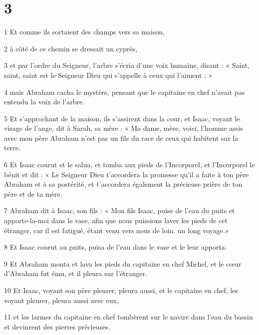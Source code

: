 \chapter{3}

\par 1 Et comme ils sortaient des champs vers sa maison,

\par 2 à côté de ce chemin se dressait un cyprès,

\par 3 et par l'ordre du Seigneur, l'arbre s'écria d'une voix humaine, disant : « Saint, saint, saint est le Seigneur Dieu qui s'appelle à ceux qui l'aiment ; »

\par 4 mais Abraham cacha le mystère, pensant que le capitaine en chef n'avait pas entendu la voix de l'arbre.

\par 5 Et s'approchant de la maison, ils s'assirent dans la cour, et Isaac, voyant le visage de l'ange, dit à Sarah, sa mère : « Ma dame, mère, voici, l'homme assis avec mon père Abraham n'est pas un fils du race de ceux qui habitent sur la terre.

\par 6 Et Isaac courut et le salua, et tomba aux pieds de l'Incorporel, et l'Incorporel le bénit et dit : « Le Seigneur Dieu t'accordera la promesse qu'il a faite à ton père Abraham et à sa postérité, et t'accordera également la précieuse prière de ton père et de ta mère.

\par 7 Abraham dit à Isaac, son fils : « Mon fils Isaac, puise de l'eau du puits et apporte-la-moi dans le vase, afin que nous puissions laver les pieds de cet étranger, car il est fatigué, étant venu vers nous de loin. un long voyage.»

\par 8 Et Isaac courut au puits, puisa de l'eau dans le vase et le leur apporta.

\par 9 Et Abraham monta et lava les pieds du capitaine en chef Michel, et le cœur d'Abraham fut ému, et il pleura sur l'étranger.

\par 10 Et Isaac, voyant son père pleurer, pleura aussi, et le capitaine en chef, les voyant pleurer, pleura aussi avec eux,

\par 11 et les larmes du capitaine en chef tombèrent sur le navire dans l'eau du bassin et devinrent des pierres précieuses.

